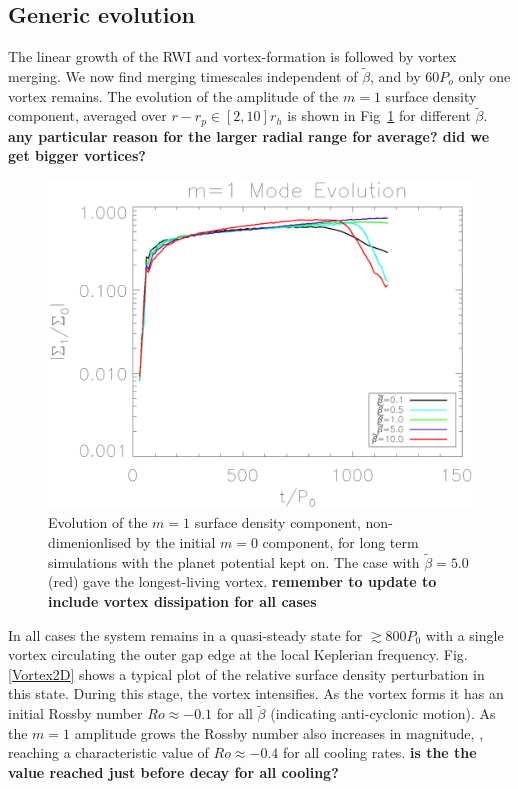\subsection{Generic evolution} 
The linear growth of the RWI and vortex-formation is followed by 
vortex merging. We now find merging timescales independent of
$\tilde\beta$, and by $60P_o$ only one vortex remains.  
The evolution of the amplitude of the $m=1$ surface density component,
averaged over $r-r_p\in[2,10]r_h$ is shown in Fig~\ref{lifetimeplot} 
for different $\tilde\beta$. 
{\bf any particular reason for the larger radial range for average?
  did we get bigger vortices?} 

\begin{figure}
  \includegraphics[width=\linewidth,clip=true,trim=0.5cm
  0cm 0cm 1cm]{figures/longterm_stability}
  \caption{Evolution of the $m=1$ surface density component,
    non-dimenionlised by the initial $m=0$ component, for long term
    simulations with the planet potential kept on. The case with 
    $\tilde\beta=5.0$ (red) gave the longest-living vortex. {\bf
      remember to update to 
      include vortex dissipation for all cases} \label{lifetimeplot}} 
\end{figure}

In all cases the system remains in a quasi-steady state for
$\gtrsim800P_0$ with a single vortex circulating 
the outer gap edge at the local Keplerian  
frequency. Fig. \ref{Vortex2D} shows a typical plot of the relative 
surface density perturbation in this state. During this stage, the 
vortex intensifies. As the vortex forms it has an initial 
Rossby number $Ro\approx-0.1$ for all $\tilde\beta$
(indicating anti-cyclonic
motion). As the $m=1$ amplitude grows the Rossby number also increases
in magnitude, 
, reaching a characteristic value of $Ro\approx-0.4$ for all cooling
rates. {\bf is the the value reached just before decay for all cooling?}

